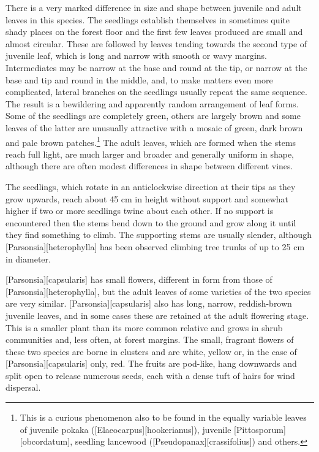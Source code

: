 There is a very marked difference in size and shape between juvenile and adult leaves in this species.
The seedlings establish themselves in sometimes quite shady places on the forest floor and the first few leaves produced are small and almost circular.
These are followed by leaves tending towards the second type of juvenile leaf, which is long and narrow with smooth or wavy margins.
Intermediates may be narrow at the base and round at the tip, or narrow at the base and tip and round in the middle, and, to make matters even more complicated, lateral branches on the seedlings usually repeat the same sequence.
The result is a bewildering and apparently random arrangement of leaf forms.
Some of the seedlings are completely green, others are largely brown and some leaves of the latter are unusually attractive with a mosaic of green, dark brown and pale brown patches.\footnote{This is a curious phenomenon also to be found in the equally variable leaves of juvenile pokaka ([Elaeocarpus][hookerianus]), juvenile [Pittosporum][obcordatum], seedling lancewood ([Pseudopanax][crassifolius]) and others.}
The adult leaves, which are formed when the stems reach full light, are much larger and broader and generally uniform in shape, although there are often modest differences in shape between different vines.

The seedlings, which rotate in an anticlockwise direction at their tips as they grow upwards, reach about 45 cm in height without support and somewhat higher if two or more seedlings twine about each other.
If no support is encountered then the stems bend down to the ground and grow along it until they find something to climb.
The supporting stems are usually slender, although [Parsonsia][heterophylla] has been observed climbing tree trunks of up to 25 cm in diameter.

[Parsonsia][capsularis] has small flowers, different in form from those of [Parsonsia][heterophylla], but the adult leaves of some varieties of the two species are very similar. [Parsonsia][capsularis] also has long, narrow, reddish-brown juvenile leaves, and in some cases these are retained at the adult flowering stage.
This is a smaller plant than its more common relative and grows in shrub communities and, less often, at forest margins.
The small, fragrant flowers of these two species are borne in clusters and are white, yellow or, in the case of [Parsonsia][capsularis] only, red.
The fruits are pod-like, hang downwards and split open to release numerous seeds, each with a dense tuft of hairs for wind dispersal.

